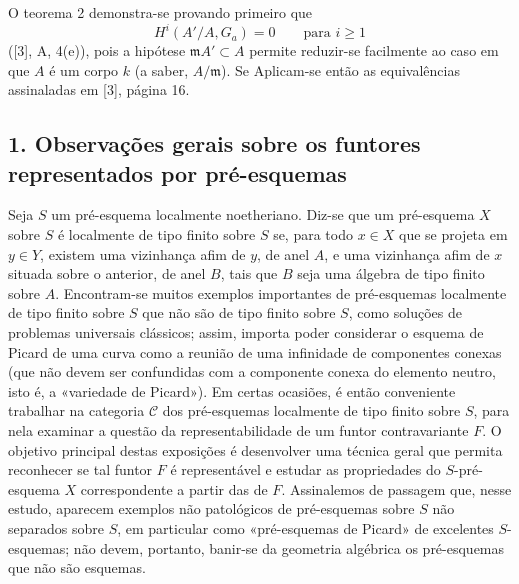 O teorema 2 demonstra-se provando primeiro que
\[
  H^i(A'/A,G_a)=0\qquad\text{para }i\geq 1
\]
([3], A, 4(e)), pois a hipótese $\mathfrak mA'\subset A$ permite reduzir-se
facilmente ao caso em que $A$ é um corpo $k$ (a saber, $A/\mathfrak m$). Se
Aplicam-se então as equivalências assinaladas em [3], página 16.


\subsection*{1. Observações gerais sobre os funtores representados por pré-esquemas}

Seja $S$ um pré-esquema localmente noetheriano. Diz-se que um pré-esquema $X$
sobre $S$ é localmente de tipo finito sobre $S$ se, para todo
$x\in X$ que se projeta em $y\in Y$, existem
uma vizinhança afim de $y$, de anel $A$, e uma vizinhança afim de $x$ situada sobre
o anterior, de anel $B$, tais que $B$ seja uma álgebra de tipo finito sobre
$A$. Encontram-se muitos exemplos importantes de pré-esquemas localmente de
tipo finito sobre $S$ que não são de tipo finito sobre $S$, como soluções de
problemas universais clássicos; assim, importa poder considerar o esquema de
Picard de uma curva como a reunião de uma infinidade de componentes conexas
(que não devem ser confundidas com a componente conexa do elemento neutro, isto
é, a «variedade de Picard»). Em certas ocasiões, é então conveniente
trabalhar na categoria $\mathcal C$ dos pré-esquemas localmente de tipo
finito sobre $S$, para nela examinar a questão da representabilidade de
um funtor contravariante $F$. O objetivo principal destas exposições é
desenvolver uma técnica geral que permita reconhecer se tal funtor $F$ é
representável e estudar as propriedades do $S$-pré-esquema $X$ correspondente
a partir das de $F$. Assinalemos de passagem que, nesse estudo, aparecem
exemplos não patológicos de pré-esquemas sobre $S$ não separados sobre $S$, em
particular como «pré-esquemas de Picard» de excelentes $S$-esquemas; não devem,
portanto, banir-se da geometria algébrica os pré-esquemas que não são
esquemas.

